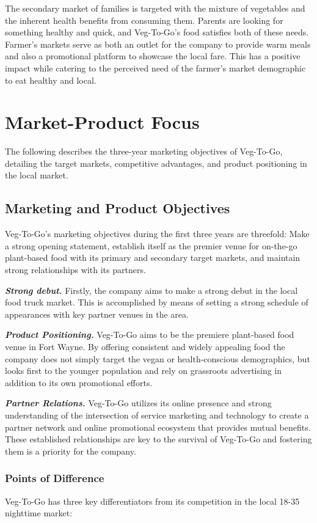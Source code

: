 \documentclass[12pt, letterpaper]{article}
\newcommand{\companyname}{Veg-To-Go}
\begin{document}
The secondary market of families is targeted with the mixture of vegetables and the inherent health benefits from consuming them.  Parents are looking for something healthy and quick, and \companyname{}'s food satisfies both of these needs. Farmer's markets serve as both an outlet for the company to provide warm meals and also a promotional platform to showcase the local fare. This has a positive impact while catering to the perceived need of the farmer's market demographic to eat healthy and local.

\newpage

\section{Market-Product Focus}
The following describes the three-year marketing objectives of \companyname{}, detailing the target markets, competitive advantages, and product positioning in the local market.
\subsection{Marketing and Product Objectives}
\companyname's{} marketing objectives during the first three years are threefold:  Make a strong opening statement, establish itself as the premier venue for on-the-go plant-based food with its primary and secondary target markets, and maintain strong relationships with its partners.

\textbf{\emph{Strong debut.}} Firstly, the company aims to make a strong debut in the local food truck market.  This is accomplished by means of setting a strong schedule of appearances with key partner venues in the area.

\textbf{\emph{Product Positioning.}} \companyname{} aims to be the premiere plant-based food venue in Fort Wayne.  By offering consistent and widely appealing food the company does not simply target the vegan or health-conscious demographics, but looks first to the younger population and rely on grassroots advertising in addition to its own promotional efforts.

\textbf{\emph{Partner Relations.}} \companyname{} utilizes its online presence and strong understanding of the intersection of service marketing and technology to create a partner network and online promotional ecosystem that provides mutual benefits. These established relationships are key to the survival of \companyname{} and fostering them is a priority for the company.

\subsubsection{Points of Difference}
\companyname{} has three key differentiators from its competition in the local 18-35 nighttime market:
\end{document}
